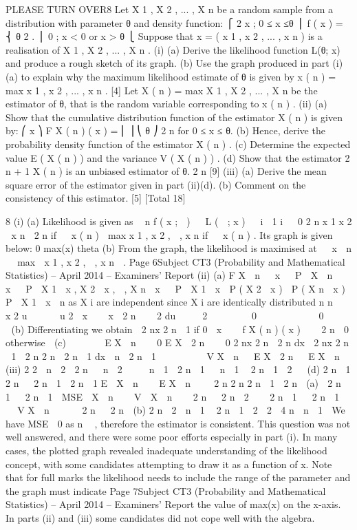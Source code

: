PLEASE TURN OVER8
Let X 1 , X 2 , ... , X n be a random sample from a distribution with parameter θ and
density function:
⎧ 2 x
; 0 ≤ x ≤θ
⎪
f ( x ) = ⎨ θ 2
.
⎪ 0
; x < 0 or x > θ
⎩
Suppose that x = ( x 1 , x 2 , ... , x n ) is a realisation of X 1 , X 2 , ... , X n .
(i)
(a) Derive the likelihood function L(θ; x) and produce a rough sketch of its
graph.
(b) Use the graph produced in part (i)(a) to explain why the maximum
likelihood estimate of θ is given by x ( n ) = max{ x 1 , x 2 , ... , x n } .
[4]
Let X ( n ) = max{ X 1 , X 2 , ... , X n } be the estimator of θ, that is the random variable
corresponding to x ( n ) .
(ii)
(a)
Show that the cumulative distribution function of the estimator X ( n ) is
given by:
⎛ x ⎞
F X ( n ) ( x ) = ⎜ ⎟
⎝ θ ⎠
2 n
for 0 ≤ x ≤ θ.
(b) Hence, derive the probability density function of the estimator X ( n ) .
(c) Determine the expected value E ( X ( n ) ) and the variance V ( X ( n ) ) .
(d) Show that the estimator
2 n + 1
X ( n ) is an unbiased estimator of θ.
2 n
[9]
(iii)
(a) Derive the mean square error of the estimator given in part (ii)(d).
(b) Comment on the consistency of this estimator.
[5]
[Total 18]

8
(i)
(a)
Likelihood is given as
 n f ( x ;  ) 

L (  ; x )   i  1 i
  0
2 n x 1 x 2  x n
 2 n
if   x ( n )  max{ x 1 , x 2 ,  , x n }
if   x ( n ) .
Its graph is given below:
0
max(x)
theta
(b)
From the graph, the likelihood is maximised at
  x  n   max  x 1 , x 2 ,  , x n  .
Page 6Subject CT3 (Probability and Mathematical Statistics) – April 2014 – Examiners’ Report
(ii)
(a)
F X
 n 
 x   P  X  n   x   P  X 1  x , X 2  x ,  , X n  x 
 P  X 1  x  P ( X 2  x )  P ( X n  x )
 P  X 1  x  n
as X i are independent
since X i are identically distributed
n
n
  x 2 u      u 2  x    x  2 n
   2 du     2     
  0 
         0     
(b)
Differentiating we obtain
 2 nx 2 n  1
if 0  x  

f X ( n ) ( x )    2 n
 0
otherwise

(c)
  
  
E X  n   
0
E X  2 n   
0
2 nx 2 n

2 n
dx 
2 nx 2 n  1
 2 n
2 n 
2 n  1
dx 
n  2
n  1
       
V X  n   E X  2 n   E X  n 
(iii)
2
2

n  2  2 n  
n  2
 


n  1  2 n  1 
 n  1  2 n  1  2
 
(d) 2 n  1 2 n 
 2 n  1
 2 n  1
E 
X  n   
E X  n  

2 n
2 n 2 n  1
 2 n

(a)  2 n  1

 2 n  1

MSE 
X  n    V 
X  n  
 2 n

 2 n

2
 
 2 n  1 
 2 n  1 
 
 V X  n   

 2 n 
 2 n 
(b)
2
n  2
 n  1  2 n  1  2
 2

4 n  n  1 
We have MSE  0 as n  , therefore the estimator is consistent.
This question was not well answered, and there were some poor efforts especially in part (i).
In many cases, the plotted graph revealed inadequate understanding of the likelihood
concept, with some candidates attempting to draw it as a function of x. Note that for full
marks the likelihood needs to include the range of the parameter and the graph must indicate
Page 7Subject CT3 (Probability and Mathematical Statistics) – April 2014 – Examiners’ Report
the value of max(x) on the x-axis. In parts (ii) and (iii) some candidates did not cope well
with the algebra.
